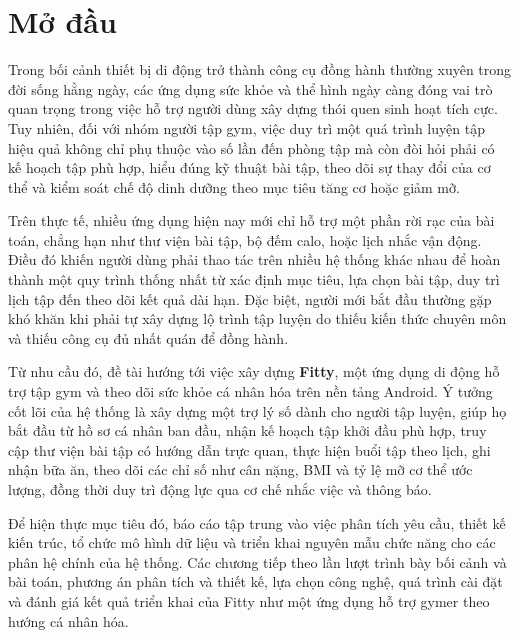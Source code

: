 \chapter*{Mở đầu}
\setcounter{page}{1}

Trong bối cảnh thiết bị di động trở thành công cụ đồng hành thường xuyên trong đời sống hằng ngày, các ứng dụng sức khỏe và thể hình ngày càng đóng vai trò quan trọng trong việc hỗ trợ người dùng xây dựng thói quen sinh hoạt tích cực. Tuy nhiên, đối với nhóm người tập gym, việc duy trì một quá trình luyện tập hiệu quả không chỉ phụ thuộc vào số lần đến phòng tập mà còn đòi hỏi phải có kế hoạch tập phù hợp, hiểu đúng kỹ thuật bài tập, theo dõi sự thay đổi của cơ thể và kiểm soát chế độ dinh dưỡng theo mục tiêu tăng cơ hoặc giảm mỡ.

Trên thực tế, nhiều ứng dụng hiện nay mới chỉ hỗ trợ một phần rời rạc của bài toán, chẳng hạn như thư viện bài tập, bộ đếm calo, hoặc lịch nhắc vận động. Điều đó khiến người dùng phải thao tác trên nhiều hệ thống khác nhau để hoàn thành một quy trình thống nhất từ xác định mục tiêu, lựa chọn bài tập, duy trì lịch tập đến theo dõi kết quả dài hạn. Đặc biệt, người mới bắt đầu thường gặp khó khăn khi phải tự xây dựng lộ trình tập luyện do thiếu kiến thức chuyên môn và thiếu công cụ đủ nhất quán để đồng hành.

Từ nhu cầu đó, đề tài hướng tới việc xây dựng \textbf{Fitty}, một ứng dụng di động hỗ trợ tập gym và theo dõi sức khỏe cá nhân hóa trên nền tảng Android. Ý tưởng cốt lõi của hệ thống là xây dựng một trợ lý số dành cho người tập luyện, giúp họ bắt đầu từ hồ sơ cá nhân ban đầu, nhận kế hoạch tập khởi đầu phù hợp, truy cập thư viện bài tập có hướng dẫn trực quan, thực hiện buổi tập theo lịch, ghi nhận bữa ăn, theo dõi các chỉ số như cân nặng, BMI và tỷ lệ mỡ cơ thể ước lượng, đồng thời duy trì động lực qua cơ chế nhắc việc và thông báo.

Để hiện thực mục tiêu đó, báo cáo tập trung vào việc phân tích yêu cầu, thiết kế kiến trúc, tổ chức mô hình dữ liệu và triển khai nguyên mẫu chức năng cho các phân hệ chính của hệ thống. Các chương tiếp theo lần lượt trình bày bối cảnh và bài toán, phương án phân tích và thiết kế, lựa chọn công nghệ, quá trình cài đặt và đánh giá kết quả triển khai của Fitty như một ứng dụng hỗ trợ gymer theo hướng cá nhân hóa.

\cleardoublepage
